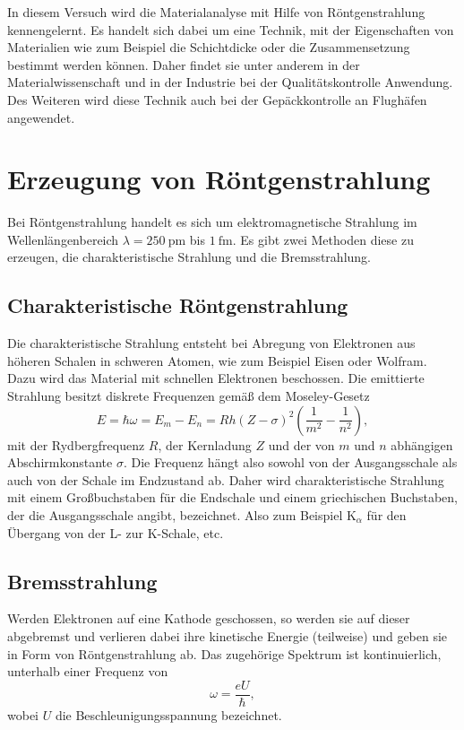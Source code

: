 In diesem Versuch wird die Materialanalyse mit Hilfe von Röntgenstrahlung kennengelernt. Es handelt sich dabei um eine Technik, mit der Eigenschaften von Materialien wie zum Beispiel die Schichtdicke oder die Zusammensetzung bestimmt werden können. Daher findet sie unter anderem in der Materialwissenschaft und in der Industrie bei der Qualitätskontrolle Anwendung.
Des Weiteren wird diese Technik auch bei der Gepäckkontrolle an Flughäfen angewendet.

\section{Erzeugung von Röntgenstrahlung}

Bei Röntgenstrahlung handelt es sich um elektromagnetische Strahlung im Wellenlängenbereich $\lambda=\SI{250}{\pico\metre}$ bis $\SI{1}{\femto\metre}$. Es gibt zwei Methoden diese zu erzeugen, die charakteristische Strahlung und die Bremsstrahlung.

\subsection{Charakteristische Röntgenstrahlung}

Die charakteristische Strahlung entsteht bei Abregung von Elektronen aus höheren Schalen in schweren Atomen, wie zum Beispiel Eisen oder Wolfram. Dazu wird das Material mit schnellen Elektronen beschossen.
Die emittierte Strahlung besitzt diskrete Frequenzen gemäß dem Moseley-Gesetz \cite{litmap}
\begin{equation}
 E = \hbar\omega = E_{m}-E_{n} = Rh\left(Z-\sigma\right)^{2}\left(\frac{1}{m^{2}}-\frac{1}{n^{2}}\right),
\end{equation}
mit der Rydbergfrequenz $R$, der Kernladung $Z$ und der von $m$ und $n$ abhängigen Abschirmkonstante $\sigma$.
Die Frequenz hängt also sowohl von der Ausgangsschale als auch von der Schale im Endzustand ab. Daher wird charakteristische Strahlung mit einem Großbuchstaben für die Endschale und einem griechischen Buchstaben, der die Ausgangsschale angibt, bezeichnet.
Also zum Beispiel K$_{\alpha}$ für den Übergang von der L- zur K-Schale, etc.

\subsection{Bremsstrahlung}

Werden Elektronen auf eine Kathode geschossen, so werden sie auf dieser abgebremst und verlieren dabei ihre kinetische Energie (teilweise) und geben sie in Form von Röntgenstrahlung ab.
Das zugehörige Spektrum ist kontinuierlich, unterhalb einer Frequenz von
\begin{equation}
 \omega = \frac{eU}{\hbar},
\end{equation}
wobei $U$ die Beschleunigungsspannung bezeichnet.

